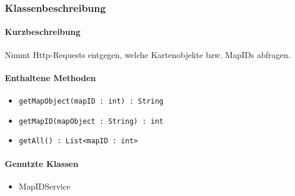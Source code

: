 \subsubsection*{Klassenbeschreibung}%
\paragraph*{Kurzbeschreibung}
Nimmt Http-Requests entgegen, welche Kartenobjekte bzw. MapIDs abfragen.
\paragraph*{Enthaltene Methoden}
\begin{itemize}
    \item \texttt{getMapObject(mapID : int) : String}
    \item \texttt{getMapID(mapObject : String) : int}
    \item \texttt{getAll() : List<mapID : int>}
\end{itemize}
\paragraph*{Genutzte Klassen}
\begin{itemize}
    \item MapIDService
\end{itemize}
